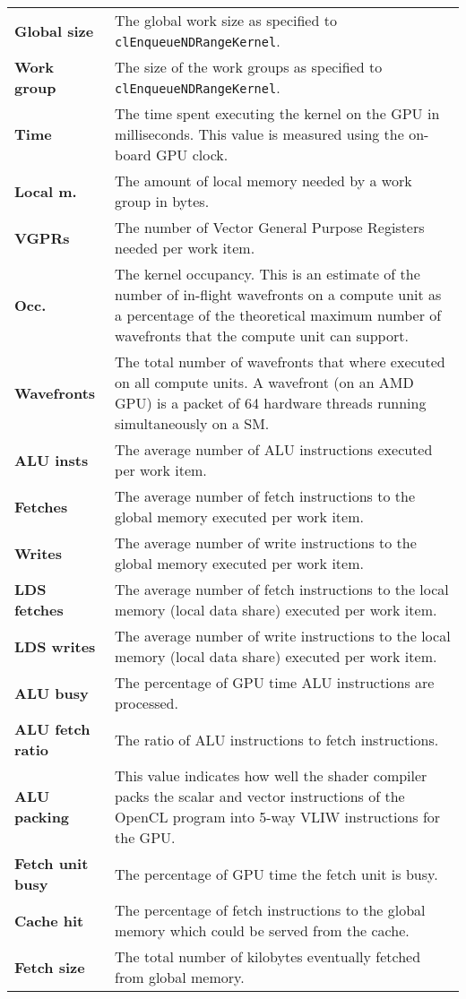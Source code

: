 \begin{table}
	\vspace{\baselineskip}
	
	\begin{tabularx}{\textwidth}{>{\bfseries}l X}
		Global size &
		The global work size as specified to \lstinline!clEnqueueNDRangeKernel!. \\
		Work group &
		The size of the work groups as specified to \lstinline!clEnqueueNDRangeKernel!. \\
		Time &
		The time spent executing the kernel on the GPU in milliseconds. This value is measured using the on-board GPU clock. \\
		Local m. &
		The amount of local memory needed by a work group in bytes. \\
		VGPRs &
		The number of Vector General Purpose Registers needed per work item. \\
		Occ. &
		The kernel occupancy. This is an estimate of the number of in-flight wavefronts on a compute unit as a percentage of the theoretical maximum number of wavefronts that the compute unit can support. \\
		Wavefronts &
		The total number of wavefronts that where executed on all compute units. A wavefront (on an AMD GPU) is a packet of 64 hardware threads running simultaneously on a SM. \\
		ALU insts &
		The average number of ALU instructions executed per work item. \\
		Fetches &
		The average number of fetch instructions to the global memory executed per work item. \\
		Writes &
		The average number of write instructions to the global memory executed per work item. \\
		LDS fetches &
		The average number of fetch instructions to the local memory (local data share) executed per work item. \\
		LDS writes &
		The average number of write instructions to the local memory (local data share) executed per work item. \\
		ALU busy &
		The percentage of GPU time ALU instructions are processed. \\
		ALU fetch ratio &
		The ratio of ALU instructions to fetch instructions. \\
		ALU packing &
		This value indicates how well the shader compiler packs the scalar and vector instructions of the OpenCL program into 5-way VLIW instructions for the GPU. \\
		Fetch unit busy &
		The percentage of GPU time the fetch unit is busy. \\
		Cache hit &
		The percentage of fetch instructions to the global memory which could be served from the cache. \\
		Fetch size &
		The total number of kilobytes eventually fetched from global memory. \\
	\end{tabularx}
		

\end{table}
